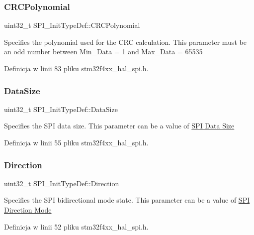 \subsubsection{\texorpdfstring{C\+R\+C\+Polynomial}{CRCPolynomial}}
{\footnotesize\ttfamily uint32\+\_\+t S\+P\+I\+\_\+\+Init\+Type\+Def\+::\+C\+R\+C\+Polynomial}

Specifies the polynomial used for the C\+RC calculation. This parameter must be an odd number between Min\+\_\+\+Data = 1 and Max\+\_\+\+Data = 65535 

Definicja w linii 83 pliku stm32f4xx\+\_\+hal\+\_\+spi.\+h.

\mbox{\label{struct_s_p_i___init_type_def_a24b7835dd877e1c4e55236303fa3387f}} 
\subsubsection{\texorpdfstring{Data\+Size}{DataSize}}
{\footnotesize\ttfamily uint32\+\_\+t S\+P\+I\+\_\+\+Init\+Type\+Def\+::\+Data\+Size}

Specifies the S\+PI data size. This parameter can be a value of \hyperlink{group___s_p_i___data___size}{S\+PI Data Size} 

Definicja w linii 55 pliku stm32f4xx\+\_\+hal\+\_\+spi.\+h.

\mbox{\label{struct_s_p_i___init_type_def_ae5c132f597c806d7a1fe316023b36867}} 
\subsubsection{\texorpdfstring{Direction}{Direction}}
{\footnotesize\ttfamily uint32\+\_\+t S\+P\+I\+\_\+\+Init\+Type\+Def\+::\+Direction}

Specifies the S\+PI bidirectional mode state. This parameter can be a value of \hyperlink{group___s_p_i___direction}{S\+PI Direction Mode} 

Definicja w linii 52 pliku stm32f4xx\+\_\+hal\+\_\+spi.\+h.

\mbox{\label{struct_s_p_i___init_type_def_a8c541d8863cb62a3212b9381b5cba447}} 
